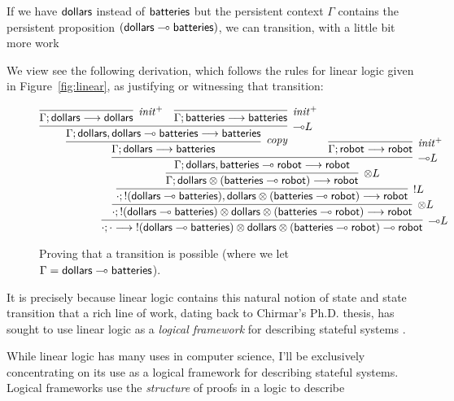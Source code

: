 If we have ${\sf dollars}$ instead of 
${\sf batteries}$ but the persistent context $\Gamma$ contains the 
persistent proposition $({\sf dollars} \multimap {\sf batteries})$, we can
transition, with a little bit more work

We view see the following derivation, which
follows the rules for linear logic given in Figure~\ref{fig:linear},
as justifying or witnessing that transition:
\begin{figure}
\[
\infer[{\lolli}L]
{\seq{\cdot}{\cdot}{{!}({\sf dollars} \lolli {\sf batteries}) \otimes
                    {\sf dollars} \otimes 
                    ({\sf batteries} \lolli {\sf robot}) \lolli {\sf robot}}}
{\infer[{\otimes}L]
{\seq{\cdot}{{!}({\sf dollars} \lolli {\sf batteries}) \otimes
                    {\sf dollars} \otimes 
                    ({\sf batteries} \lolli {\sf robot})}{{\sf robot}}}
{\infer[{!}L]
{\seq{\cdot}{{!}({\sf dollars} \lolli {\sf batteries}),
                    {\sf dollars} \otimes 
                    ({\sf batteries} \lolli {\sf robot})}{{\sf robot}}}
{\infer[{\otimes}L]
{\seq{\Gamma}{{\sf dollars} \otimes 
                    ({\sf batteries} \lolli {\sf robot})}{{\sf robot}}}
{\infer[{\lolli}L]
{\seq{\Gamma}{{\sf dollars}, {\sf batteries} \lolli {\sf robot}}{{\sf robot}}}
{\infer[{\it copy}]
 {\seq{\Gamma}{{\sf dollars}}{{\sf batteries}}}
 {\infer[{\lolli}L] 
  {\seq{\Gamma}{{\sf dollars}, {\sf dollars} \lolli {\sf batteries}}{{\sf batteries}}}
  {\infer[{\it init}^+]
   {\seq{\Gamma}{{\sf dollars}}{{\sf dollars}}}
   {}
   &
   \infer[{\it init}^+]
   {\seq{\Gamma}{{\sf batteries}}{{\sf batteries}}}
   {}}}
 &
 \infer[{\it init}^+]
 {\seq{\Gamma}{{\sf robot}}{{\sf robot}}}
 {}}}}}}
\] 
\caption{Proving that a transition is possible 
(where we let $\Gamma = {\sf dollars} \multimap {\sf batteries}$).}
\label{fig:unfocused-robot}
\end{figure}
It is precisely because linear logic contains this natural notion of
state and state transition that a rich line of work, dating back to
Chirmar's Ph.D. thesis, has sought to use linear logic as a {\it
  logical framework} for describing stateful systems
\cite{chirimar95proof,cervesato02linear,
  cervesato02concurrent,pfenning04substructural,miller09formalizing,
  pfenning09substructural,cervesato09relating}.

While linear logic has many uses in computer science, I'll be
exclusively concentrating on its use as a logical framework for
describing stateful systems. Logical frameworks use the {\it
  structure} of proofs in a logic to describe

